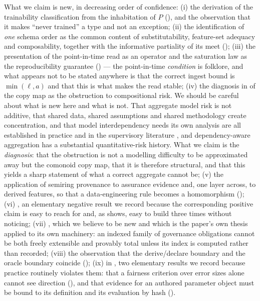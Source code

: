 \documentclass[11pt,a4paper]{article}
\renewcommand{\_}{\oldunderscore\allowbreak}
\theoremstyle{plain}
\theoremstyle{definition}
\theoremstyle{definition}
\theoremstyle{remark}
\begin{document}
What we claim is new, in decreasing order of confidence:
(i) the derivation of the trainability classification from the inhabitation of $P$
(), and the observation that it makes ``never trained'' a type and not an
exception;
(ii) the identification of \emph{one} schema order as the common content of substitutability, feature-set
adequacy and composability, together with the informative partiality of its meet
();
(iii) the presentation of the point-in-time read as an operator and the saturation law as the
reproducibility guarantee () --- the point-in-time \emph{condition} is
folklore, and what appears not to be stated anywhere is that the correct ingest bound is
$\min(\ell,a)$ and that this is what makes the read stable;
(iv) the diagnosis in  of the copy map as the obstruction to compositional risk. We
should be careful about what is new here and what is not. That aggregate model risk is not additive, that
shared data, shared assumptions and shared methodology create concentration, and that model
interdependency needs its own analysis are all established in practice and in the supervisory literature
\cite{sr262,ss123}, and dependency-aware aggregation has a substantial quantitative-risk history. What we
claim is the \emph{diagnosis}: that the obstruction is not a modelling difficulty to be approximated away
but the comonoid copy map, that it is therefore structural, and that this yields a sharp statement of what
a correct aggregate cannot be;
(v) the application of semiring provenance to assurance evidence and, one layer across, to derived
features, so that a data-engineering rule becomes a homomorphism ();
(vi) , an elementary negative result we record because the corresponding positive
claim is easy to reach for and, as  shows, easy to build three times without noticing;
(vii) , which we believe to be new and which is the paper's own thesis applied to
its own machinery: an indexed family of governance obligations cannot be both freely extensible and
provably total unless its index is computed rather than recorded;
(viii) the observation that the derive/declare boundary and the oracle boundary coincide
();
(ix) in , two elementary results we record because practice routinely violates them:
that a fairness criterion over error sizes alone cannot see direction (), and that evidence
for an authored parameter object must be bound to its definition and its evaluation by hash
().
\end{document}
